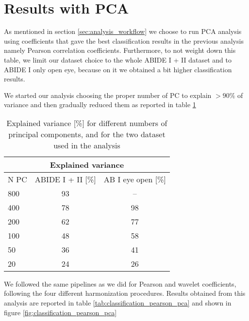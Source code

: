 \documentclass[11pt]{report}
\begin{document}
\newpage

\section{Results with PCA}\label{sec:results_pca}

As mentioned in section \ref{sec:analysis_workflow} we choose to run PCA analysis using coefficients that gave the best classification results in the previous analysis namely Pearson correlation coefficients. Furthermore, to not weight down this table, we limit our dataset choice to the whole ABIDE I + II dataset and to ABIDE I only open eye, because on it we obtained a bit higher classification results.

We started our analysis choosing the proper number of PC to explain $> 90\%$ of variance and then gradually reduced them as reported in table \ref{tab:pca_explained}

\begin{table}[h]
\centering
\begin{tabular}{ |l|c c| }
\hline
\multicolumn{3}{|c|}{Explained variance} \\
 \hline
  N PC & ABIDE I + II [\%] & AB I eye open [\%] \\
  \hline
 800 & 93 & -- \\
 400 & 78 & 98 \\
 200 & 62 & 77 \\
 100 &48 & 58 \\
 50 & 36 & 41 \\
 20 & 24 & 26\\
 \hline
\end{tabular}
\caption{Explained variance [\%] for different numbers of principal components, and for the two dataset used in the analysis}
\label{tab:pca_explained}
\end{table}


We followed the same pipelines as we did for Pearson and wavelet coefficients, following the four different harmonization procedures.
Results obtained from this analysis are reported in table \ref{tab:classification_pearson_pca} and shown in figure \ref{fig:classification_pearson_pca}
\end{document}

